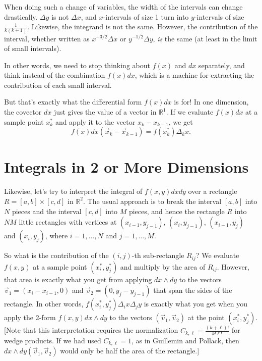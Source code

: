\documentclass[12pt]{amsbook}
\newcommand{\R}{{\mathbb R}}
\theoremstyle{definition}
\begin{document}
When doing such a change of variables, the width of the intervals can change
drastically. $\Delta y$ is not $\Delta x$, and $x$-intervals of size 1 turn
into $y$-intervals of size $\frac{1}{k(k+1)}$. Likewise, the integrand is not
the same. However, the contribution of the interval, whether written as 
$x^{-3/2} \Delta x$ or $y^{-1/2}\Delta y$, {\em is} the same (at least in
the limit of small intervals). 

In other words, we need to stop thinking about $f(x)$ and $dx$ separately, 
and think instead of the combination $f(x) dx$, which is a machine for 
extracting the contribution of each small interval. 

But that's exactly what the differential form $f(x) dx$ is for! In one
dimension, the covector $dx$ just gives the value of a vector in
$\R^1$. If we evaluate $f(x) dx$ at a sample point $x_k^*$ and apply it to
the vector $x_k-x_{k-1}$, we get
$$ f(x) dx (\vec x_k-\vec x_{k-1}) = f(x_k^*) \Delta_k x.$$

\section{Integrals in 2 or More Dimensions}

Likewise, let's try to interpret the integral of $f(x,y) dx dy$ over
a rectangle $R=[a,b] \times [c,d]$ in $\R^2$. The usual approach is to 
break the interval $[a,b]$ into $N$ pieces and the interval $[c,d]$ into
$M$ pieces, and hence the rectangle $R$ into $NM$ little rectangles with
vertices at $(x_{i-1},y_{j-1})$, $(x_i,y_{j-1})$, $(x_{i-1},y_j)$ and $(x_i,y_j)$,
where $i=1,\ldots,N$ and $j=1,\ldots,M$. 

So what is the contribution of the $(i,j)$-th sub-rectangle $R_{ij}$?
We evaluate $f(x,y)$ at a sample point $(x_i^*,y_j^*)$ and multiply by
the area of $R_{ij}$. However, that area is exactly what you get from
applying $dx \wedge dy$ to the vectors $\vec v_1=(x_i-x_{i-1},0)$ and
$\vec v_2=(0,y_j-y_{j-1})$ that span the sides of the rectangle. In
other words, $f(x_i^*,y_j^*) \Delta_ix \Delta_j y$ is exactly what you
get when you apply the 2-form $f(x,y) dx\wedge dy$ to the vectors
$(\vec v_1,\vec v_2)$ at the point $(x_i^*,y_j^*)$. [Note that this
interpretation requires the normalization
$C_{k,\ell}=\frac{(k+\ell)!}{k!\ell!}$ for wedge products. If we had
used $C_{k,\ell}=1$, as in Guillemin and Pollack, then $dx \wedge
dy(\vec v_1, \vec v_2)$ would only be half the area of the rectangle.]
\end{document}
